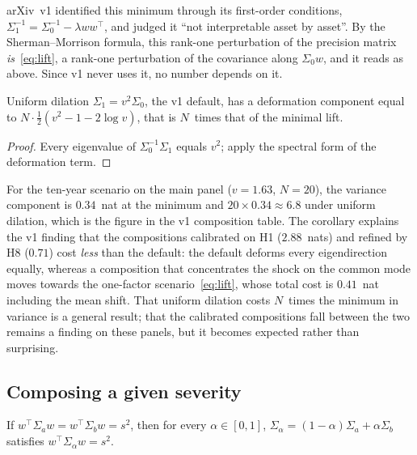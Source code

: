 \begin{remark}[Correction to v1]
arXiv~v1 identified this minimum through its first-order conditions,
$\Sigma_1^{-1}=\Sigma_0^{-1}-\lambda ww^\top$, and judged it ``not interpretable
asset by asset''. By the Sherman--Morrison formula, this rank-one perturbation of
the precision matrix \emph{is}~\eqref{eq:lift}, a rank-one perturbation of the
covariance along $\Sigma_0w$, and it reads as above. Since v1 never uses it, no
number depends on it.
\end{remark}

\begin{corollary}
\label{cor:uniform}
Uniform dilation $\Sigma_1=v^2\Sigma_0$, the v1 default, has a deformation
component equal to $N\cdot\tfrac12(v^2-1-2\log v)$, that is $N$~times that of the
minimal lift.
\end{corollary}

\begin{proof}
Every eigenvalue of $\Sigma_0^{-1}\Sigma_1$ equals $v^2$; apply the spectral form
of the deformation term.
\end{proof}

For the ten-year scenario on the main panel ($v=1.63$, $N=20$), the variance
component is $0.34$~nat at the minimum and $20\times0.34\approx6.8$ under uniform
dilation, which is the figure in the v1 composition table. The corollary
explains the v1 finding that the compositions calibrated on H1 ($2.88$~nats) and
refined by H8 ($0.71$) cost \emph{less} than the default: the default deforms
every eigendirection equally, whereas a composition that concentrates the shock
on the common mode moves towards the one-factor scenario~\eqref{eq:lift}, whose
total cost is $0.41$~nat including the mean shift. That uniform dilation costs
$N$~times the minimum in variance is a general result; that the calibrated
compositions fall between the two remains a finding on these panels, but it
becomes expected rather than surprising.

\subsection{Composing a given severity}

\begin{proposition}
\label{prop:composition}
If $w^\top\Sigma_aw=w^\top\Sigma_bw=s^2$, then for every $\alpha\in[0,1]$,
$\Sigma_\alpha=(1-\alpha)\Sigma_a+\alpha\Sigma_b$ satisfies
$w^\top\Sigma_\alpha w=s^2$.
\end{proposition}

